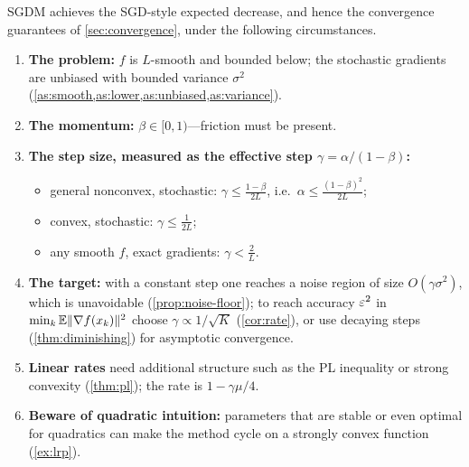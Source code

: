 SGDM achieves the SGD-style expected decrease, and hence the convergence guarantees of
\cref{sec:convergence}, under the following circumstances.
\begin{enumerate}
\item \textbf{The problem:} $f$ is $L$-smooth and bounded below; the stochastic gradients are
  unbiased with bounded variance $\sigma^2$ (\cref{as:smooth,as:lower,as:unbiased,as:variance}).
\item \textbf{The momentum:} $\beta\in[0,1)$---friction must be present.
\item \textbf{The step size, measured as the effective step $\gamma=\alpha/(1-\beta)$:}
  \begin{itemize}
  \item general nonconvex, stochastic: $\gamma\le\frac{1-\beta}{2L}$, i.e.\ $\alpha\le\frac{(1-\beta)^2}{2L}$;
  \item convex, stochastic: $\gamma\le\frac{1}{2L}$;
  \item any smooth $f$, exact gradients: $\gamma<\frac2L$.
  \end{itemize}
\item \textbf{The target:} with a constant step one reaches a noise region of size
  $O(\gamma\sigma^2)$, which is unavoidable (\cref{prop:noise-floor}); to reach accuracy
  $\varepsilon^2$ in $\min_k\mathbb{E}\lVert \nabla f(x_k)\rVert^2$ choose $\gamma\propto1/\sqrt K$
  (\cref{cor:rate}), or use decaying steps (\cref{thm:diminishing}) for asymptotic convergence.
\item \textbf{Linear rates} need additional structure such as the PL inequality or strong
  convexity (\cref{thm:pl}); the rate is $1-\gamma\mu/4$.
\item \textbf{Beware of quadratic intuition:} parameters that are stable or even optimal for
  quadratics can make the method cycle on a strongly convex function (\cref{ex:lrp}).
\end{enumerate}
